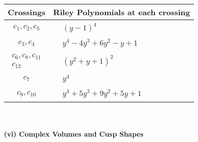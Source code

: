 \documentclass[1p]{elsarticle_modified}
\theoremstyle{definition}
\begin{document}
\begin{tabular}{m{50pt}|m{274pt}}
Crossings & \hspace{64pt}Riley Polynomials at each crossing \\
\hline $$\begin{aligned}c_{1},c_{2},c_{5}\end{aligned}$$&$\begin{aligned}
&(y-1)^4
\end{aligned}$\\
\hline $$\begin{aligned}c_{3},c_{4}\end{aligned}$$&$\begin{aligned}
&y^4-4 y^3+6 y^2- y+1
\end{aligned}$\\
\hline $$\begin{aligned}c_{6},c_{8},c_{11}\\c_{12}\end{aligned}$$&$\begin{aligned}
&(y^2+y+1)^2
\end{aligned}$\\
\hline $$\begin{aligned}c_{7}\end{aligned}$$&$\begin{aligned}
&y^4
\end{aligned}$\\
\hline $$\begin{aligned}c_{9},c_{10}\end{aligned}$$&$\begin{aligned}
&y^4+5 y^3+9 y^2+5 y+1
\end{aligned}$\\
\hline
\end{tabular}\\~\\
\newpage\flushleft \textbf{(vi) Complex Volumes and Cusp Shapes}
\end{document}

